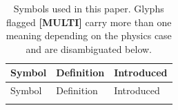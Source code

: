 %

\onecolumngrid
\begingroup
\renewcommand{\arraystretch}{1.25}
\begin{longtable}{@{}p{} p{} p{}@{}}
\caption{Symbols used in this paper. Glyphs flagged \textbf{[MULTI]} carry more
than one meaning depending on the physics case and are disambiguated below.}
\label{tab:variables}\\
\hline\hline
Symbol & Definition & Introduced \\
\hline
\endfirsthead
\hline\hline
Symbol & Definition & Introduced \\
\hline
\endhead
\hline
\endfoot
\hline\hline
\endlastfoot


\end{longtable}
